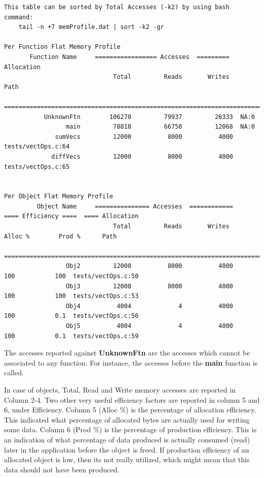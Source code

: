 \documentclass[10pt]{article}
\begin{document}
{
\tiny
\begin{Verbatim}[frame=single, samepage=true]
 This table can be sorted by Total Accesses (-k2) by using bash command:
    tail -n +7 memProfile.dat | sort -k2 -gr

Per Function Flat Memory Profile 
       Function Name     ================= Accesses  =========    Allocation
                              Total         Reads       Writes       Path
 ==========================================================================
           UnknownFtn        106270         79937         26333  NA:0
                 main         78818         66750         12068  NA:0
              sumVecs         12000          8000          4000  tests/vectOps.c:64
             diffVecs         12000          8000          4000  tests/vectOps.c:65


Per Object Flat Memory Profile 
         Object Name     =============== Accesses  ============        ==== Efficiency ====  ==== Allocation
                              Total         Reads       Writes        Alloc %        Prod %      Path
 ============================================================================================================
                 Obj2         12000          8000          4000           100           100  tests/vectOps.c:50
                 Obj3         12000          8000          4000           100           100  tests/vectOps.c:53
                 Obj4          4004             4          4000           100           0.1  tests/vectOps.c:56
                 Obj5          4004             4          4000           100           0.1  tests/vectOps.c:59
\end{Verbatim}
}

The accesses reported against \textbf{UnknownFtn} are the accesses which cannot
be associated to any function. For instance, the accesses before the \textbf{main}
function is called.

In case of objects, Total, Read and Write memory accesses are reported in
Column 2-4. Two other very useful efficiency factors are reported in column 5
and 6, under Efficiency. Column 5 (Alloc \%) is the percentage of allocation
efficiency. This indicated what percentage of allocated bytes are actually
used for writing some data. Column 6 (Prod \%) is the percentage of
production efficiency. This is an indication of what percentage of data
produced is actually consumed (read) later in the application before the
object is freed. If production efficiency of an allocated object is low, then
its not really utilized, which might mean that this data should not have been
produced.
\end{document}
